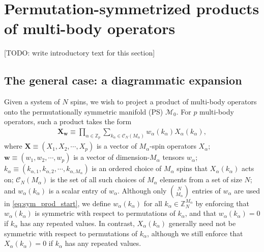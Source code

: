 \documentclass[nofootinbib,notitlepage,11pt]{revtex4-2}
\newcommand{\p}[1]{\left(#1\right)} %
\newcommand{\m}{\bm} %
\newcommand{\1}{\mathds{1}}
\newcommand{\C}{\mathcal{C}}
\newcommand{\M}{\mathcal{M}}
\newcommand{\ZZ}{\mathbb{Z}}
\newcommand{\red}[1]{{\color{red} #1}}
\begin{document}
\section{Permutation-symmetrized products of multi-body operators}
\label{sec:operator_product}

\red{[TODO: write introductory text for this section]}

\subsection{The general case: a diagrammatic expansion}

Given a system of $N$ spins, we wish to project a product of
multi-body operators onto the permutationally symmetric manifold (PS)
$\M_0$.  For $p$ multi-body operators, such a product takes the form
\begin{align}
  \m X_{\m w}
  \equiv \prod_{\alpha\in\ZZ_p} \sum_{k_\alpha\in\C_N\p{M_\alpha}}
  w_\alpha\p{k_\alpha} X_\alpha\p{k_\alpha},
  \label{eq:sym_prod_start}
\end{align}
where $\m X\equiv\p{X_1,X_2,\cdots,X_p}$ is a vector of
$M_\alpha$-spin operators $X_\alpha$;
$\m w\equiv\p{w_1,w_2,\cdots,w_p}$ is a vector of dimension-$M_\alpha$
tensors $w_\alpha$;
$k_\alpha\equiv\p{k_{\alpha,1},k_{\alpha,2},\cdots,k_{\alpha,M_\alpha}}$
is an ordered choice of $M_\alpha$ spins that $X_\alpha\p{k_\alpha}$
acts on; $\C_N\p{M_\alpha}$ is the set of all such choices of
$M_\alpha$ elements from a set of size $N$; and $w_\alpha\p{k_\alpha}$
is a scalar entry of $w_\alpha$.  Although only ${N \choose M_\alpha}$
entries of $w_\alpha$ are used in \eqref{eq:sym_prod_start}, we define
$w_\alpha\p{k_\alpha}$ for all $k_\alpha\in\ZZ_N^{M_\alpha}$ by
enforcing that $w_\alpha\p{k_\alpha}$ is symmetric with respect to
permutations of $k_\alpha$, and that $w_\alpha\p{k_\alpha}=0$ if
$k_\alpha$ has any repeated values.  In contrast,
$X_\alpha\p{k_\alpha}$ generally need not be symmetric with respect to
permutations of $k_\alpha$, although we still enforce that
$X_\alpha\p{k_\alpha}=0$ if $k_\alpha$ has any repeated values.
\end{document}

